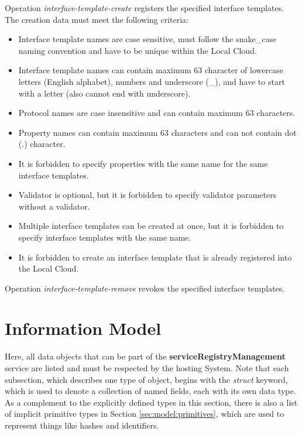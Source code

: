 \documentclass[a4paper]{arrowhead}
\begin{document}

Operation \textit{interface-template-create} registers the specified interface templates. The creation data must meet the following criteria:

\begin{itemize}
    \item Interface template names are case sensitive, must follow the snake\_case naming convention and have to be unique within the Local Cloud.
    \item Interface template names can contain maximum 63 character of lowercase letters (English alphabet), numbers and underscore (\_), and have to start with a letter (also cannot end with underscore).
    \item Protocol names are case insensitive and can contain maximum 63 characters.
    \item Property names can contain maximum 63 characters and can not contain dot (.) character.
    \item It is forbidden to specify properties with the same name for the same interface templates.
    \item Validator is optional, but it is forbidden to specify validator parameters without a validator.
    \item Multiple interface templates can be created at once, but it is forbidden to specify interface templates with the same name.
    \item It is forbidden to create an interface template that is already registered into the Local Cloud.
\end{itemize}


Operation \textit{interface-template-remove} revokes the specified interface templates.

\clearpage

\section{Information Model}
\label{sec:model}

Here, all data objects that can be part of the \textbf{serviceRegistryManagement} service
are listed and must be respected by the hosting System.
Note that each subsection, which describes one type of object, begins with the \textit{struct} keyword, which is used to denote a collection of named fields, each with its own data type.
As a complement to the explicitly defined types in this section, there is also a list of implicit primitive types in Section \ref{sec:model:primitives}, which are used to represent things like hashes and identifiers.
\end{document}
